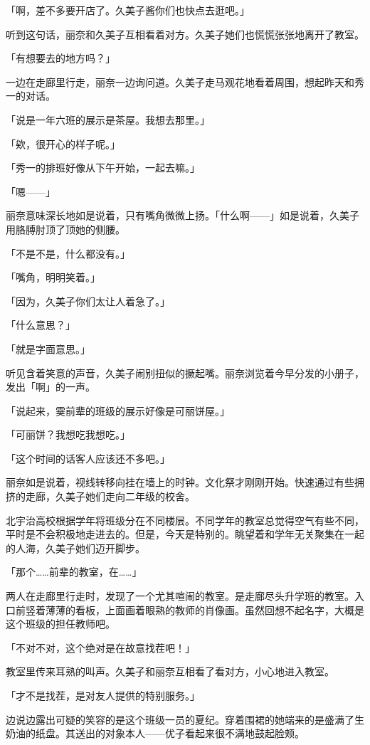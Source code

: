 \documentclass[UTF8]{ctexart}
\begin{document}
    「啊，差不多要开店了。久美子酱你们也快点去逛吧。」

    听到这句话，丽奈和久美子互相看着对方。久美子她们也慌慌张张地离开了教室。

    「有想要去的地方吗？」

    一边在走廊里行走，丽奈一边询问道。久美子走马观花地看着周围，想起昨天和秀一的对话。

    「说是一年六班的展示是茶屋。我想去那里。」

    「欸，很开心的样子呢。」

    「秀一的排班好像从下午开始，一起去嘛。」

    「嗯——」

    丽奈意味深长地如是说着，只有嘴角微微上扬。「什么啊——」如是说着，久美子用胳膊肘顶了顶她的侧腰。

    「不是不是，什么都没有。」

    「嘴角，明明笑着。」

    「因为，久美子你们太让人着急了。」

    「什么意思？」

    「就是字面意思。」

    听见含着笑意的声音，久美子闹别扭似的撅起嘴。丽奈浏览着今早分发的小册子，发出「啊」的一声。

    「说起来，霙前辈的班级的展示好像是可丽饼屋。」

    「可丽饼？我想吃我想吃。」

    「这个时间的话客人应该还不多吧。」

    丽奈如是说着，视线转移向挂在墙上的时钟。文化祭才刚刚开始。快速通过有些拥挤的走廊，久美子她们走向二年级的校舍。

    北宇治高校根据学年将班级分在不同楼层。不同学年的教室总觉得空气有些不同，平时是不会积极地走进去的。但是，今天是特别的。眺望着和学年无关聚集在一起的人海，久美子她们迈开脚步。

    「那个……前辈的教室，在……」

    两人在走廊里行走时，发现了一个尤其喧闹的教室。是走廊尽头升学班的教室。入口前竖着薄薄的看板，上面画着眼熟的教师的肖像画。虽然回想不起名字，大概是这个班级的担任教师吧。

    「不对不对，这个绝对是在故意找茬吧！」

    教室里传来耳熟的叫声。久美子和丽奈互相看了看对方，小心地进入教室。

    「才不是找茬，是对友人提供的特别服务。」

    边说边露出可疑的笑容的是这个班级一员的夏纪。穿着围裙的她端来的是盛满了生奶油的纸盘。其送出的对象本人——优子看起来很不满地鼓起脸颊。
\end{document}

